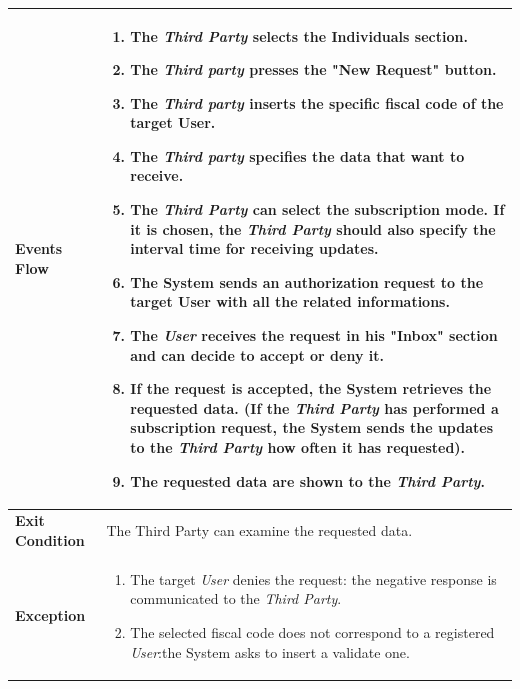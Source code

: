 \begin{table}[H]
\begin{tabular}{|p{3.5cm}|p{10.3cm}|}
    \hline
    \textbf{\large{Events Flow}}		& \begin{enumerate}[leftmargin=0.5cm]
                                            \item The \emph{Third Party} selects the Individuals section.
                                          	\item The \emph{Third party}  presses the "New Request" button.
                                            \item The \emph{Third party} inserts the specific fiscal code of the target User.
                                            \item The \emph{Third party} specifies the data that want to receive.
                                            \item The \emph{Third Party} can select the subscription mode. If 
                                        it is chosen, the \emph{Third Party} should also specify the interval time for receiving updates.
                                            \item The System sends an authorization request to the target User with all the related informations.
                                            \item  The \emph{User} receives the request in his "Inbox" section and can decide to accept or deny it.
                                            \item If the request is accepted, the System retrieves the requested data. (If the \emph{Third Party} has performed a subscription request, the System sends the updates to the \emph{Third Party} how often it has requested).
                                            \item The requested data are shown to the \emph{Third Party}.
                                
                                          \end{enumerate}
    										\\
    \hline
    \textbf{\large{Exit Condition}} 	& The Third Party can examine the requested data. \\
    
    \hline
    \textbf{\large{Exception}} 			& \begin{enumerate}[leftmargin=0.5cm]
                                          	\item The target \emph{User} denies the request: the negative response is communicated to the \emph{Third Party}.
                                          	\item The selected fiscal code does not correspond to a registered \emph{User}:the System asks to insert a validate one.
	\end{enumerate}\\
    
    \hline
    
    \end{tabular}
	
\end{table}

